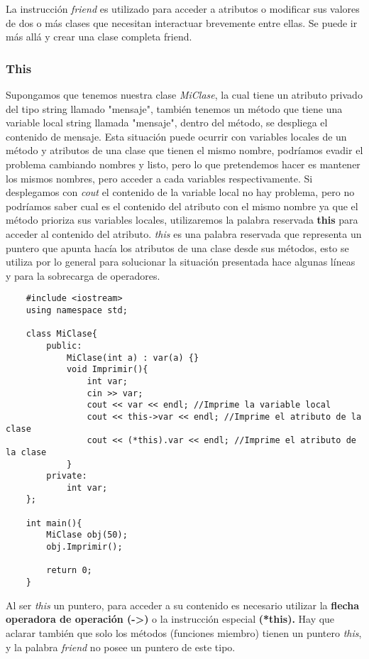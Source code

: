 La instrucción \textit{friend} es utilizado para acceder a atributos o modificar sus valores de dos o más clases que necesitan interactuar brevemente entre ellas. Se puede ir más allá y crear una clase completa friend.


\subsubsection{This}
\hspace{0.55cm}Supongamos que tenemos nuestra clase \textit{MiClase}, la cual tiene un atributo privado del tipo string llamado "mensaje", también tenemos un método que tiene una variable local string llamada "mensaje", dentro del método, se despliega el contenido de mensaje. Esta situación puede ocurrir con variables locales de un método y atributos de una clase que tienen el mismo nombre, podríamos evadir el problema cambiando nombres y listo, pero lo que pretendemos hacer es mantener los mismos nombres, pero acceder a cada variables respectivamente. Si desplegamos con \textit{cout} el contenido de la variable local no hay problema, pero no podríamos saber cual es el contenido del atributo con el mismo nombre ya que el método prioriza sus variables locales, utilizaremos la palabra reservada \textbf{this} para acceder al contenido del atributo. \textit{this} es una palabra reservada que representa un puntero que apunta hacía los atributos de una clase desde sus métodos, esto se utiliza por lo general para solucionar la situación presentada hace algunas líneas y para la sobrecarga de operadores.
\begin{lstlisting}
    #include <iostream>
    using namespace std;

    class MiClase{
        public:
            MiClase(int a) : var(a) {}
            void Imprimir(){
                int var;
                cin >> var;
                cout << var << endl; //Imprime la variable local
                cout << this->var << endl; //Imprime el atributo de la clase
                cout << (*this).var << endl; //Imprime el atributo de la clase
            }
        private:
            int var;
    };
    
    int main(){
        MiClase obj(50);
        obj.Imprimir();
        
        return 0;
    }
\end{lstlisting}

Al ser \textit{this} un puntero, para acceder a su contenido es necesario utilizar la \textbf{flecha operadora de operación (->)} o la instrucción especial \textbf{(*this).} Hay que aclarar también que solo los métodos (funciones miembro) tienen un puntero \textit{this}, y la palabra \textit{friend} no posee un puntero de este tipo.


